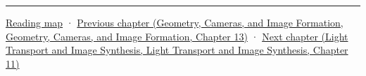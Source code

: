 \begin{center}\rule{0.5\linewidth}{0.5pt}\end{center}

\hyperref[volume-reading-map]{Reading map} · \href{../03-Geometry-Cameras-and-Image-Formation/main.pdf\#nameddest=06-engine-ii-ch030-depth-projection-and-shadow-map-precision}{Previous chapter (Geometry, Cameras, and Image Formation, Geometry, Cameras, and Image Formation, Chapter 13)} · \href{../04-Light-Transport-and-Image-Synthesis/main.pdf\#nameddest=06-engine-ii-ch032-terrain-materials-and-image-composition}{Next chapter (Light Transport and Image Synthesis, Light Transport and Image Synthesis, Chapter 11)}

